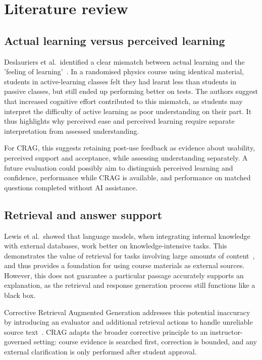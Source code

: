 \chapter{Literature review}
\section{Actual learning versus perceived learning}
Deslauriers et al.\ identified a clear mismatch between actual learning and the 'feeling of learning'~\parencite{deslauriers2019}. In a randomised physics course using identical material, students in active-learning classes felt they had learnt less than students in passive classes, but still ended up performing better on tests. The authors suggest that increased cognitive effort contributed to this mismatch, as students may interpret the difficulty of active learning as poor understanding on their part. It thus highlights why perceived ease and perceived learning require separate interpretation from assessed understanding.

For CRAG, this suggests retaining post-use feedback as evidence about usability, perceived support and acceptance, while assessing understanding separately. A future evaluation could possibly aim to distinguish perceived learning and confidence, performance while CRAG is available, and performance on matched questions completed without AI assistance.

\section{Retrieval and answer support}
Lewis et al.\ showed that language models, when integrating internal knowledge with external databases, work better on knowledge-intensive tasks. This demonstrates the value of retrieval for tasks involving large amounts of content~\parencite{lewis}, and thus provides a foundation for using course materials as external sources. However, this does not guarantee a particular passage accurately supports an explanation, as the retrieval and response generation process still functions like a black box.

Corrective Retrieval Augmented Generation addresses this potential inaccuracy  by introducing an evaluator and additional retrieval actions to handle unreliable source text~\parencite{yan}. CRAG adapts the broader corrective principle to an instructor-governed setting: course evidence is searched first, correction is bounded, and any external clarification is only performed after student approval.

